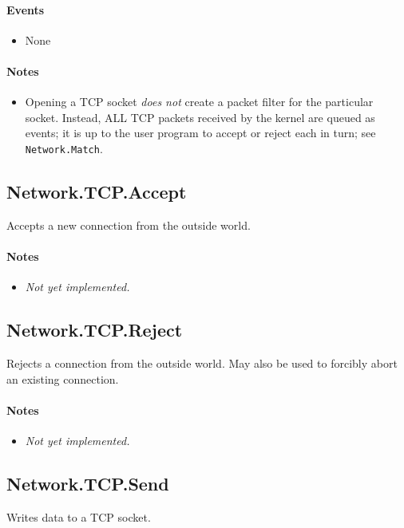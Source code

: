\paragraph{Events}

\begin{itemize}
\item None
\end{itemize}

\paragraph{Notes}

\begin{itemize}
\item Opening a TCP socket {\em does not} create a packet filter for the particular socket.  Instead, ALL TCP packets received by the kernel are queued as events; it is up to the user program to accept or reject each in turn; see \verb+Network.Match+.
\end{itemize}

\subsection*{Network.TCP.Accept}
Accepts a new connection from the outside world.

\paragraph{Notes}

\begin{itemize}
\item {\em Not yet implemented.}
\end{itemize}

\subsection*{Network.TCP.Reject}
Rejects a connection from the outside world.  May also be used to forcibly abort an existing connection.

\paragraph{Notes}

\begin{itemize}
\item {\em Not yet implemented.}
\end{itemize}

\subsection*{Network.TCP.Send}
Writes data to a TCP socket.

